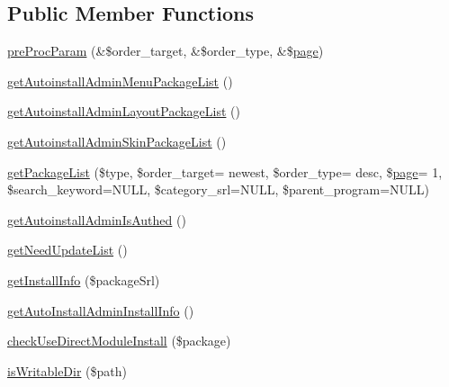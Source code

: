 \subsection*{Public Member Functions}
\begin{DoxyCompactItemize}
\item 
\hyperlink{classautoinstallAdminModel_a614c3051b3e9abff8c17dfc0664d6da5}{pre\+Proc\+Param} (\&\$order\+\_\+target, \&\$order\+\_\+type, \&\$\hyperlink{classpage}{page})
\item 
\hyperlink{classautoinstallAdminModel_a9cb4da298ab863dec8b7664cac2e42a5}{get\+Autoinstall\+Admin\+Menu\+Package\+List} ()
\item 
\hyperlink{classautoinstallAdminModel_a3892c760f1b77e23fdb38a9784cf0ec2}{get\+Autoinstall\+Admin\+Layout\+Package\+List} ()
\item 
\hyperlink{classautoinstallAdminModel_aee0002dcda8a05d57f8f7e5304be087c}{get\+Autoinstall\+Admin\+Skin\+Package\+List} ()
\item 
\hyperlink{classautoinstallAdminModel_a908daae5c3fb3b9c1c58f6ecf9dcd78f}{get\+Package\+List} (\$type, \$order\+\_\+target= \textquotesingle{}newest\textquotesingle{}, \$order\+\_\+type= \textquotesingle{}desc\textquotesingle{}, \$\hyperlink{classpage}{page}= \textquotesingle{}1\textquotesingle{}, \$search\+\_\+keyword=N\+U\+LL, \$category\+\_\+srl=N\+U\+LL, \$parent\+\_\+program=N\+U\+LL)
\item 
\hyperlink{classautoinstallAdminModel_ac0b475b5969fded7a56103ba2e1fa710}{get\+Autoinstall\+Admin\+Is\+Authed} ()
\item 
\hyperlink{classautoinstallAdminModel_a6bba9a390c1274bc3c39a39310781b01}{get\+Need\+Update\+List} ()
\item 
\hyperlink{classautoinstallAdminModel_a8824834dd97b7e69b74af51778d27ed6}{get\+Install\+Info} (\$package\+Srl)
\item 
\hyperlink{classautoinstallAdminModel_ad6d50fbb755d2b48cdbd4269a1d1e404}{get\+Auto\+Install\+Admin\+Install\+Info} ()
\item 
\hyperlink{classautoinstallAdminModel_a899c3f3182e6c80b28f0aabc261bf38c}{check\+Use\+Direct\+Module\+Install} (\$package)
\item 
\hyperlink{classautoinstallAdminModel_ab3314bacf64ba16ea88180124699fc54}{is\+Writable\+Dir} (\$path)
\end{DoxyCompactItemize}
